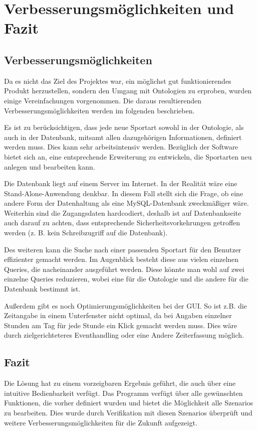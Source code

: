\chapter{Verbesserungsmöglichkeiten und Fazit}

\section{Verbesserungsmöglichkeiten}

Da es nicht das Ziel des Projektes war, ein möglichst gut funktionierendes Produkt herzustellen, sondern den Umgang mit Ontologien zu erproben, wurden einige Vereinfachungen vorgenommen. Die daraus resultierenden Verbesserungsmöglichkeiten werden im folgenden beschrieben. 

Es ist zu berücksichtigen, dass jede neue Sportart sowohl in der Ontologie, als auch in der Datenbank, mitsamt allen dazugehörigen Informationen, definiert werden muss. Dies kann sehr arbeitsintensiv werden. Bezüglich der Software bietet sich an, eine entsprechende Erweiterung zu entwickeln, die Sportarten neu anlegen und bearbeiten kann. 

Die Datenbank liegt auf einem Server im Internet. In der Realität wäre eine Stand-Alone-Anwendung denkbar. In diesem Fall stellt sich die Frage, ob eine andere Form der Datenhaltung als eine MySQL-Datenbank zweckmäßiger wäre. Weiterhin sind die Zugangsdaten hardcodiert, deshalb ist auf Datenbankseite auch darauf zu achten, dass entsprechende Sicherheitsvorkehrungen getroffen werden (z. B. kein Schreibzugriff auf die Datenbank).

Des weiteren kann die Suche nach einer passenden Sportart für den Benutzer effizienter gemacht werden. Im Augenblick besteht diese aus vielen einzelnen Queries, die nacheinander ausgeführt werden. Diese könnte man wohl auf zwei einzelne Queries reduzieren, wobei eine für die Ontologie und die andere für die Datenbank bestimmt ist. 

Außerdem gibt es noch Optimierungsmöglichkeiten bei der GUI. 
So ist z.B. die Zeitangabe in einem Unterfenster nicht optimal, da bei Angaben einzelner Stunden am Tag für jede Stunde ein Klick gemacht werden muss. Dies wäre durch zielgerichteteres Eventhandling oder eine Andere Zeiterfassung möglich.

\section{Fazit}

Die Lösung hat zu einem vorzeigbaren Ergebnis geführt, die auch über eine intuitive Bedienbarkeit verfügt. Das Programm verfügt über alle gewünschten Funktionen, die vorher definiert wurden und bietet die Möglichkeit alle Szenarios zu bearbeiten. Dies wurde durch Verifikation mit diesen Szenarios überprüft und weitere Verbesserungsmöglichkeiten für die Zukunft aufgezeigt.